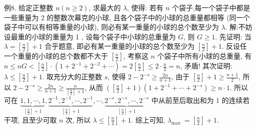 例8. 给定正整数 $n(n \geqslant 2)$, 求最大的 $\lambda$, 使得: 若有 $n$ 个袋子,每一个袋子中都是一些重量为 2 的整数次幕克的小球, 且各个袋子中的小球的总重量都相等 (同一个袋子中可以有相等重量的小球), 则必有某一重量的小球的总个数至少为 $\lambda$. 
解:不妨设最重的小球的重量为 1 , 设每个袋子中小球的总重量为 $G$, 则 $G \geqslant 1$.
先证明: 当 $\lambda=\left[\frac{n}{2}\right]+1$ 合乎题意, 即必有某一重量的小球的总个数至少为 $\left[\frac{n}{2}\right]+1$.
反设任一个重量的小球的总个数都不大于 $\left[\frac{n}{2}\right]$, 考察这 $n$ 个袋子中所有小球的总重量, 有 $n \leqslant n G<\left[\frac{n}{2}\right] \cdot\left(1+2^{-1}+2^{-2}+\cdots\right)=2\left[\frac{n}{2}\right] \leqslant 2 \cdot \frac{n}{2}=n$, 矛盾!
其次证明: $\lambda \leqslant\left[\frac{n}{2}\right]+1$. 取充分大的正整数 $s$, 使得 $2-2^{-s} \geqslant \frac{2 n}{n+1}$, 由于 $\left[\frac{n}{2}\right]+1 \geqslant \frac{n+1}{2}$, 所以 $2-2^{-s} \geqslant \frac{2 n}{n+1} \geqslant \frac{n}{\left[\frac{n}{2}\right]+1}$, 从而 $\left(\left[\frac{n}{2}\right]+1\right)\left(1+2^{-1}+\cdots+\right. \left.2^{-s}\right) \geqslant n \cdot 1$.
所以可在 $\underbrace{1,1, \cdots, 1}_{\left[\frac{n}{2}\right]+1}, \underbrace{2^{-1}, 2^{-1}, \cdots, 2^{-1}}_{\left[\frac{n}{2}\right]+1}, \cdots, \underbrace{2^{-s}, 2^{-s}, \cdots, 2^{-s}}_{\left[\frac{n}{2}\right]+1}$ 中从前至后取出和为 1 的连续若干项, 且至少可取 $n$ 次, 所以 $\lambda \leqslant\left[\frac{n}{2}\right]+1$.
综上可知, $\lambda_{\text {max }}=\left[\frac{n}{2}\right]+1$.


